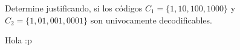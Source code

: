 
Determine justificando, si los códigos $C_1 = \{1, 10, 100, 1000\}$ y $C_2 = \{1, 01, 001, 0001\}$ son univocamente decodificables.
\begin{sols}
    Hola :p
\end{sols}